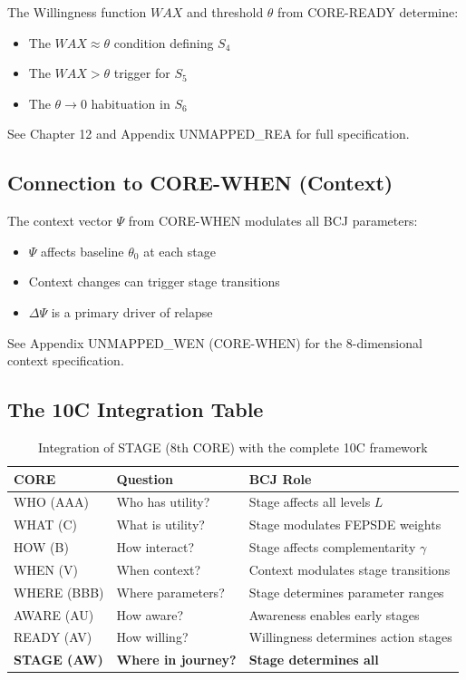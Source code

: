 \begin{cross-reference}
The Willingness function $WAX$ and threshold $\theta$ from CORE-READY determine:
\begin{itemize}
    \item The $WAX \approx \theta$ condition defining $S_4$
    \item The $WAX > \theta$ trigger for $S_5$
    \item The $\theta \to 0$ habituation in $S_6$
\end{itemize}
See Chapter 12 and Appendix UNMAPPED_REA for full specification.
\end{cross-reference}

\subsection{Connection to CORE-WHEN (Context)}
\label{sec:bcj-context}

\begin{cross-reference}
The context vector $\Psi$ from CORE-WHEN modulates all BCJ parameters:
\begin{itemize}
    \item $\Psi$ affects baseline $\theta_0$ at each stage
    \item Context changes can trigger stage transitions
    \item $\Delta\Psi$ is a primary driver of relapse
\end{itemize}
See Appendix UNMAPPED_WEN (CORE-WHEN) for the 8-dimensional context specification.
\end{cross-reference}

\subsection{The 10C Integration Table}

\begin{table}[h]
\centering
\begin{tabular}{lll}
\toprule
\textbf{CORE} & \textbf{Question} & \textbf{BCJ Role} \\
\midrule
WHO (AAA) & Who has utility? & Stage affects all levels $L$ \\
WHAT (C) & What is utility? & Stage modulates FEPSDE weights \\
HOW (B) & How interact? & Stage affects complementarity $\gamma$ \\
WHEN (V) & When context? & Context modulates stage transitions \\
WHERE (BBB) & Where parameters? & Stage determines parameter ranges \\
AWARE (AU) & How aware? & Awareness enables early stages \\
READY (AV) & How willing? & Willingness determines action stages \\
\textbf{STAGE (AW)} & \textbf{Where in journey?} & \textbf{Stage determines all} \\
\bottomrule
\end{tabular}
\caption{Integration of STAGE (8th CORE) with the complete 10C framework}
\label{tab:10c-integration}
\end{table}


